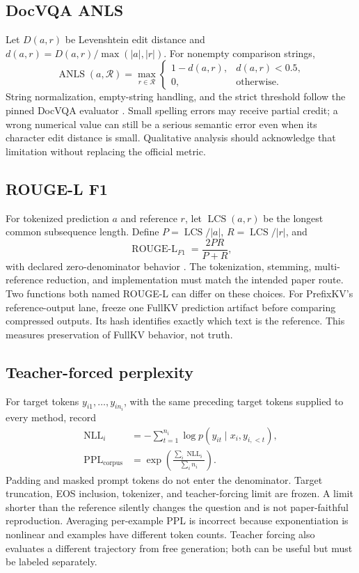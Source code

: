 \subsection{DocVQA ANLS}
Let $D(a,r)$ be Levenshtein edit distance and
$d(a,r)=D(a,r)/\max(|a|,|r|)$. For nonempty comparison strings,
\begin{equation}
 \operatorname{ANLS}(a,\mathcal R)
 =\max_{r\in\mathcal R}
 \begin{cases}1-d(a,r),&d(a,r)<0.5,\\0,&\text{otherwise}.
 \end{cases}
\end{equation}
String normalization, empty-string handling, and the strict threshold follow
the pinned DocVQA evaluator \citep{mathew2021docvqa}. Small spelling errors may
receive partial credit; a wrong numerical value can still be a serious semantic
error even when its character edit distance is small. Qualitative analysis
should acknowledge that limitation without replacing the official metric.

\subsection{ROUGE-L F1}
For tokenized prediction $a$ and reference $r$, let
$\operatorname{LCS}(a,r)$ be the longest common subsequence length. Define
$P=\operatorname{LCS}/|a|$, $R=\operatorname{LCS}/|r|$, and
\begin{equation}
 \operatorname{ROUGE\mbox{-}L}_{F1}=\frac{2PR}{P+R},
\end{equation}
with declared zero-denominator behavior \citep{lin2004rouge}. The tokenization,
stemming, multi-reference reduction, and implementation must match the intended
paper route. Two functions both named ROUGE-L can differ on these choices.
For PrefixKV's reference-output lane, freeze one FullKV prediction artifact
before comparing compressed outputs. Its hash identifies exactly which text
is the reference. This measures preservation of FullKV behavior, not truth.

\subsection{Teacher-forced perplexity}
For target tokens $y_{i1},\ldots,y_{in_i}$, with the same preceding target
tokens supplied to every method, record
\begin{align}
 \operatorname{NLL}_i&=-\sum_{t=1}^{n_i}\log p(y_{it}\mid x_i,y_{i,<t}),\\
 \operatorname{PPL}_{\mathrm{corpus}}
 &=\exp\!\left(\frac{\sum_i\operatorname{NLL}_i}{\sum_i n_i}\right).
\end{align}
Padding and masked prompt tokens do not enter the denominator. Target
truncation, EOS inclusion, tokenizer, and teacher-forcing limit are frozen.
A limit shorter than the reference silently changes the question and is not
paper-faithful reproduction. Averaging per-example PPL is incorrect because
exponentiation is nonlinear and examples have different token counts.
Teacher forcing also evaluates a different trajectory from free generation;
both can be useful but must be labeled separately.

